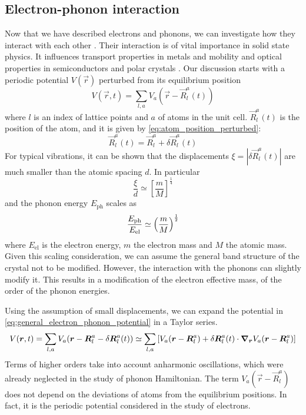 \subsection{Electron-phonon interaction}
Now that we have described electrons and phonons, we can investigate how they interact with each other \cite{cohenFundamentalsCondensedMatter, tempere}. Their interaction is of vital importance in solid state physics. It influences transport properties in metals and mobility and optical properties in semiconductors and polar crystals \cite{tempere}. Our discussion starts with a periodic potential $V(\vec{r})$ perturbed from its equilibrium position
\begin{equation} \label{eq:general_electron_phonon_potential}
    V(\vec{r}, t) = \sum_{l,a} V_a(\vec{r} - \vec{R}_l^a(t))
\end{equation}
where $l$ is an index of lattice points and $a$ of atoms in the unit cell. $\vec{R}_l^a(t)$ is the position of the atom, and it is given by \cref{eq:atom_position_perturbed}:
\begin{equation}
    \vec{R}_l^a(t) = \vec{R}_l^a + \delta \vec{R}_l^a(t)
\end{equation}
For typical vibrations, it can be shown that the displacements $\xi = |\delta \vec{R}_l^a(t)|$ are much smaller than the atomic spacing $d$. In particular
\begin{equation}
    \frac{\xi}{d} \simeq \left[ \frac{m}{M} \right]^\frac{1}{4}
\end{equation}
and the phonon energy $E_\text{ph}$ scales as
\begin{equation}
    \frac{E_\text{ph}}{E_\text{el}} \simeq \left( \frac{m}{M} \right)^{\frac{1}{2}}
\end{equation}
where $E_\text{el}$ is the electron energy, $m$ the electron mass and $M$ the atomic mass. Given this scaling consideration, we can assume the general band structure of the crystal not to be modified. However, the interaction with the phonons can slightly modify it. This results in a modification of the electron effective mass, of the order of the phonon energies.

Using the assumption of small displacements, we can expand the potential in \cref{eq:general_electron_phonon_potential} in a Taylor series.
\begin{multline}
    V(\mathbf{\boldsymbol{r}}, t) = \sum_{l,a} V_a(\mathbf{\boldsymbol{r}} - \mathbf{\boldsymbol{R}}_l^a - \delta \mathbf{\boldsymbol{R}}_l^a(t))
    \simeq \sum_{l,a} \left[ V_a(\mathbf{\boldsymbol{r}} - \mathbf{\boldsymbol{R}}_l^a) + \delta \mathbf{\boldsymbol{R}}_l^a(t) \cdot \grad_{\mathbf{\boldsymbol{r}}} V_a(\mathbf{\boldsymbol{r}} - \mathbf{\boldsymbol{R}}_l^a) \right]
\end{multline}
Terms of higher orders take into account anharmonic oscillations, which were already neglected in the study of phonon Hamiltonian. The term $V_a(\vec{r} - \vec{R}_l^a)$ does not depend on the deviations of atoms from the equilibrium positions. In fact, it is the periodic potential considered in the study of electrons.

